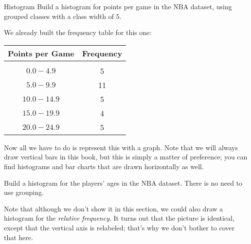 \begin{example}[https://www.youtube.com/watch?v=lGMR3d5CXRo&list=PLfmpjsIzhzttL_Uec2nCbDRcAcUF7NKG8&index=10]{Histogram}
Build a histogram for points per game in the NBA dataset, using grouped classes with a class width of 5.

\sol
We already built the frequency table for this one:
\begin{center}
\begin{tabular}{c c}
\textbf{Points per Game} & \textbf{Frequency}\\
\hline
& \\
$0.0 - 4.9$ & 5\\
$5.0 - 9.9$ & 11\\
$10.0 - 14.9$ & 5\\
$15.0 - 19.9$ & 4\\
$20.0 - 24.9$ & 5
\end{tabular}
\end{center}
Now all we have to do is represent this with a graph.  Note that we will always draw vertical bars in this book, but this is simply a matter of preference; you can find histograms and bar charts that are drawn horizontally as well.
\begin{center}
\end{center}
\end{example}

\begin{try}
Build a histogram for the players' ages in the NBA dataset.  There is no need to use grouping.
\end{try}

Note that although we don't show it in this section, we could also draw a histogram for the \emph{relative frequency}.  It turns out that the picture is identical, except that the vertical axis is relabeled; that's why we don't bother to cover that here.


